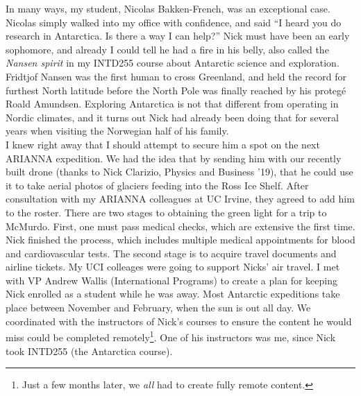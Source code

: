 \documentclass[../../../main.tex]{subfiles}
\begin{document}
In many ways, my student, Nicolas Bakken-French, was an exceptional case.  Nicolas simply walked into my office with confidence, and said ``I heard you do research in Antarctica.  Is there a way I can help?''  Nick must have been an early sophomore, and already I could tell he had a fire in his belly, also called the \textit{Nansen spirit} in my INTD255 course about Antarctic science and exploration.  Fridtjof Nansen was the first human to cross Greenland, and held the record for furthest North latitude before the North Pole was finally reached by his proteg\'{e} Roald Amundsen.  Exploring Antarctica is not that different from operating in Nordic climates, and it turns out Nick had already been doing that for several years when visiting the Norwegian half of his family.
\\
\vspace{0.25cm}
I knew right away that I should attempt to secure him a spot on the next ARIANNA expedition.  We had the idea that by sending him with our recently built drone (thanks to Nick Clarizio, Physics and Business '19), that he could use it to take aerial photos of glaciers feeding into the Ross Ice Shelf.  After consultation with my ARIANNA colleagues at UC Irvine, they agreed to add him to the roster.  There are two stages to obtaining the green light for a trip to McMurdo.  First, one must pass medical checks, which are extensive the first time.  Nick finished the process, which includes multiple medical appointments for blood and cardiovascular tests.  The second stage is to acquire travel documents and airline tickets.  My UCI colleages were going to support Nicks' air travel.  I met with VP Andrew Wallis (International Programs) to create a plan for keeping Nick enrolled as a student while he was away.  Most Antarctic expeditions take place between November and February, when the sun is out all day.  We coordinated with the instructors of Nick's courses to ensure the content he would miss could be completed remotely\footnote{Just a few months later, we \textit{all} had to create fully remote content.}.  One of his instructors was me, since Nick took INTD255 (the Antarctica course).
\\
\vspace{0.25cm}
\end{document}
